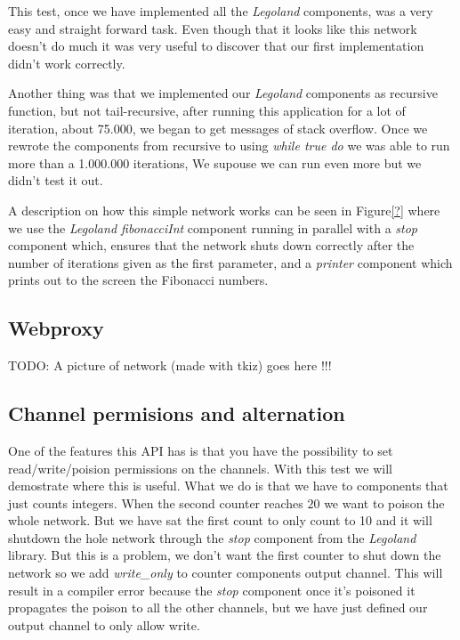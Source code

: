 \documentclass[a4paper,12pt]{article}
\begin{document}
This test, once we have implemented all the {\it Legoland}\cite{vintercsp}
components, was a very easy and straight forward task. Even though that it
looks like this network doesn't do much it was very useful to discover that
our first implementation didn't work correctly.

Another thing was that we implemented our {\it Legoland} components as
recursive function, but not tail-recursive, after running this application
for a lot of iteration, about 75.000, we began to get messages of stack
overflow. Once we rewrote the components from recursive to using {\it while true
do} we was able to run more than a 1.000.000 iterations, We supouse we can
run even more but we didn't test it out.

A description on how this simple network works can be seen in Figure\ref{?}
where we use the {\it Legoland fibonacciInt} component running in parallel
with a {\it stop} component which, ensures that the network shuts down correctly
after the number of iterations given as the first parameter, and a {\it printer}
component which prints out to the screen the Fibonacci numbers.


\subsection{Webproxy}

TODO: A picture of network (made with tkiz) goes here !!!

\subsection{Channel permisions and alternation}

One of the features this API has is that you have the possibility to set 
read/write/poision permissions on the channels. With this test we will
demostrate where this is useful. What we do is that we have to components
that just counts integers. When the second counter reaches $20$ we want
to poison the whole network. But we have sat the first count to only count
to 10 and it will shutdown the hole network through the {\it stop}
component from the {\it Legoland} library. But this is a problem, we don't
want the first counter to shut down the network so we add {\it write\_only}
to counter components output channel. This will result in a compiler error
because the {\it stop} component once it's poisoned it propagates the poison
to all the other channels, but we have just defined our output channel to
only allow write.
\end{document}
